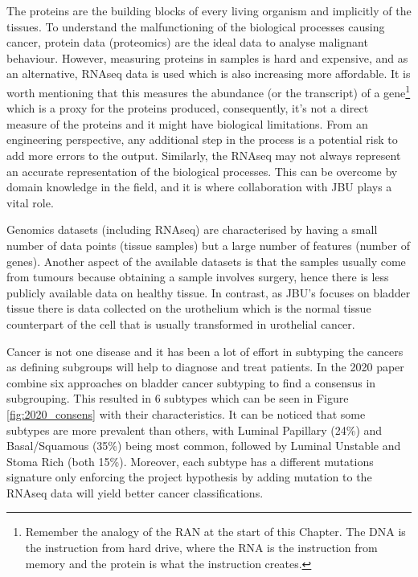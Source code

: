 The proteins are the building blocks of every living organism and implicitly of the tissues. To understand the malfunctioning of the biological processes causing cancer, protein data (proteomics) are the ideal data to analyse malignant behaviour. However, measuring proteins in samples is hard and expensive, and as an alternative, RNAseq data is used which is also increasing more affordable. It is worth mentioning that this measures the abundance (or the transcript) of a gene\footnote{Remember the analogy of the RAN at the start of this Chapter. The DNA is the instruction from hard drive, where the RNA is the instruction from memory and the protein is what the instruction creates.} which is a proxy for the proteins produced, consequently, it's not a direct measure of the proteins and it might have biological limitations. From an engineering perspective, any additional step in the process is a potential risk to add more errors to the output. Similarly, the RNAseq may not always represent an accurate representation of the biological processes. This can be overcome by domain knowledge in the field, and it is where collaboration with JBU plays a vital role.

Genomics datasets (including RNAseq) are characterised by having a small number of data points (tissue samples) but a large number of features (number of genes). Another aspect of the available datasets is that the samples usually come from tumours because obtaining a sample involves surgery, hence there is less publicly available data on healthy tissue. In contrast, as JBU's focuses on bladder tissue there is data collected on the urothelium which is the normal tissue counterpart of the cell that is usually transformed in urothelial cancer.

Cancer is not one disease and it has been a lot of effort in subtyping the cancers as defining subgroups will help to diagnose and treat patients. In the 2020 paper \citet{Kamoun2020-tj} combine six approaches \cite{Mo2018-rl, Damrauer2014-tc, Choi2014-ed, Marzouka2018-ge, Rebouissou2014-ep,Robertson2017-mg} on bladder cancer subtyping to find a consensus in subgrouping. This resulted in 6 subtypes which can be seen in Figure \ref{fig:2020_consens} with their characteristics. It can be noticed that some subtypes are more prevalent than others, with Luminal Papillary (24\%) and Basal/Squamous (35\%) being most common, followed by Luminal Unstable and Stoma Rich (both 15\%). Moreover, each subtype has a different mutations signature only enforcing the project hypothesis by adding mutation to the RNAseq data will yield better cancer classifications.

